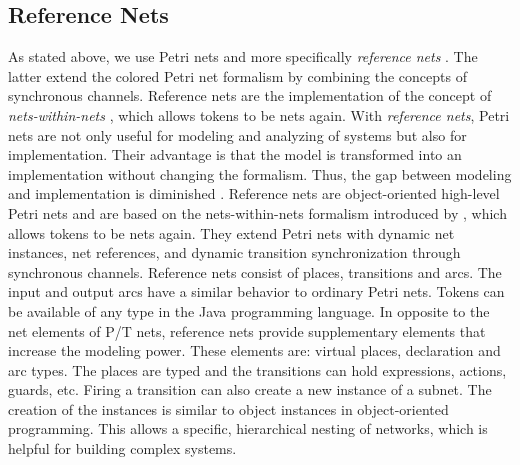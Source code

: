 \subsection{Reference Nets}
%
As stated above, we use Petri nets and more specifically \textit{reference nets} \cite{Kummer02}.%
%
The latter extend the colored Petri net formalism by combining the concepts of synchronous channels.
%
Reference nets are the implementation of the concept of \emph{nets-within-nets} \cite{Valk98}, which allows tokens to be nets again.
%
With \textit{reference nets}, Petri nets are not only useful for modeling and analyzing of systems but also for implementation.
%
Their advantage is that the model is transformed into an implementation without changing the formalism.
%
Thus, the gap between modeling and implementation is diminished \cite{Cabac09c}.
%
%
Reference nets are object-oriented high-level Petri nets and are based on the nets-within-nets formalism introduced by \cite{Valk98}, which allows tokens to be nets again.
%
They extend Petri nets with dynamic net instances, net references, and dynamic transition synchronization through synchronous channels. Reference nets consist of places, transitions and arcs. 
%
The input and output arcs have a similar behavior to ordinary Petri nets. 
%
Tokens can be available of any type  in the Java programming language.
%
In opposite to the net elements of P/T nets, reference nets provide supplementary elements that increase the modeling power. 
%
These elements are: virtual places, declaration and arc types.
%
The places are typed and the transitions can hold expressions, actions, guards, etc.
%
Firing a transition can also create a new instance of a subnet.
%
The creation of the instances is similar to object instances in object-oriented programming.
%
This allows a specific, hierarchical nesting of networks, which is helpful for building complex systems.

